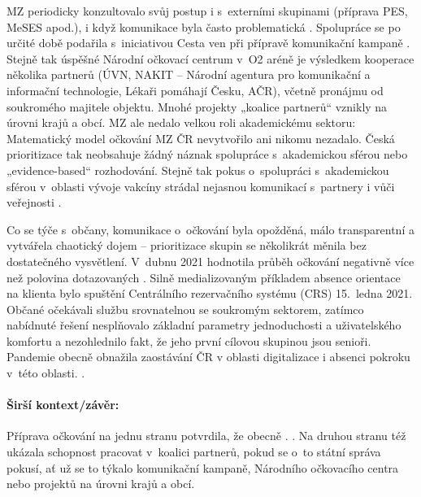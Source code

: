 MZ periodicky konzultovalo svůj postup i s~externími skupinami (příprava PES, MeSES apod.), i když komunikace byla často problematická \cite{irozhlas_smejkalovu_2021, jerabkova_smejkal_2021}. Spolupráce se po určité době podařila s~iniciativou Cesta ven při přípravě komunikační kampaně \cite{mudrochova_kampan_2020}. Stejně tak úspěšné Národní očkovací centrum v~O2 aréně je výsledkem kooperace několika partnerů (ÚVN, NAKIT -- Národní agentura pro komunikační a informační technologie, Lékaři pomáhají Česku, AČR), včetně pronájmu od soukromého majitele objektu. Mnohé projekty „koalice partnerů“ vznikly na úrovni krajů a obcí. MZ ale nedalo velkou roli akademickému sektoru: Matematický model očkování MZ ČR nevytvořilo ani nikomu nezadalo. Česká prioritizace \cite{strategie_ockovani_mzcr_2020} tak neobsahuje žádný náznak spolupráce s~akademickou sférou nebo „evidence-based“ rozhodování. Stejně tak pokus o~spolupráci s~akademickou sférou v~oblasti vývoje vakcíny strádal nejasnou komunikací s~partnery i vůči veřejnosti \cite{bezdekova_ceska_2021}.

Co se týče  s~občany, komunikace o~očkování byla opožděná, málo transparentní a vytvářela chaotický dojem -- prioritizace skupin se několikrát měnila bez dostatečného vysvětlení. V~dubnu 2021 hodnotila průběh očkování negativně více než polovina dotazovaných \cite{cvvm_verejnost_ockovani_2021}. Silně medializovaným příkladem absence orientace na klienta bylo spuštění Centrálního rezervačního systému (CRS) 15.~ledna 2021. Občané očekávali službu srovnatelnou se soukromým sektorem, zatímco nabídnuté řešení nesplňovalo základní parametry jednoduchosti a u\-ži\-va\-tel\-ské\-ho komfortu \cite{blaha_registrace_2021} a nezohlednilo fakt, že jeho první cílovou skupinou jsou senioři. Pandemie obecně obnažila zaostávání ČR v oblasti digitalizace \cite{usela_pres_2021} i absenci pokroku v~této oblasti. \cite{european_comission_desi_2020, hlidac_nedigitalni_2021}.

\paragraph{Širší kontext/závěr:} Příprava očkování na jednu stranu potvrdila, že obecně . \cite{hudema_hudema_2021}. Na druhou stranu též ukázala schopnost pracovat v~koalici partnerů, pokud se o~to státní správa pokusí, ať už se to týkalo komunikační kampaně, Národního očkovacího centra nebo projektů na úrovni krajů a obcí.

